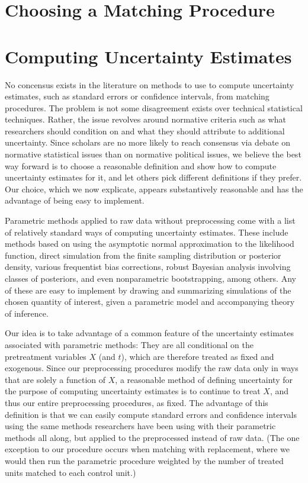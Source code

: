 \documentclass[11pt,titlepage]{article}
\begin{document}
\section{Choosing a Matching Procedure}

\section{Computing Uncertainty Estimates}

No concensus exists in the literature on methods to use to compute
uncertainty estimates, such as standard errors or confidence
intervals, from matching procedures.  The problem is not some
disagreement exists over technical statistical techniques.  Rather,
the issue revolves around normative criteria such as what researchers
should condition on and what they should attribute to additional
uncertainty.  Since scholars are no more likely to reach consensus via
debate on normative statistical issues than on normative political
issues, we believe the best way forward is to choose a reasonable
definition and show how to compute uncertainty estimates for it, and
let others pick different definitions if they prefer.  Our choice,
which we now explicate, appears substantively reasonable and has the
advantage of being easy to implement.

Parametric methods applied to raw data without preprocessing come with
a list of relatively standard ways of computing uncertainty estimates.
These include methods based on using the asymptotic normal
approximation to the likelihood function, direct simulation from the
finite sampling distribution or posterior density, various frequentist
bias corrections, robust Bayesian analysis involving classes of
posteriors, and even nonparametric bootstrapping, among others.  Any
of these are easy to implement by drawing and summarizing simulations
of the chosen quantity of interest, given a parametric model and
accompanying theory of inference.

Our idea is to take advantage of a common feature of the uncertainty
estimates associated with parametric methods: They are all conditional
on the pretreatment variables $X$ (and $t$), which are therefore
treated as fixed and exogenous.  Since our preprocessing procedures
modify the raw data only in ways that are solely a function of $X$, a
reasonable method of defining uncertainty for the purpose of computing
uncertainty estimates is to continue to treat $X$, and thus our entire
preprocessing procedures, as fixed.  The advantage of this definition
is that we can easily compute standard errors and confidence intervals
using the same methods researchers have been using with their
parametric methods all along, but applied to the preprocessed instead
of raw data.  (The one exception to our procedure occurs when matching
with replacement, where we would then run the parametric procedure
weighted by the number of treated units matched to each control unit.)
\end{document}
